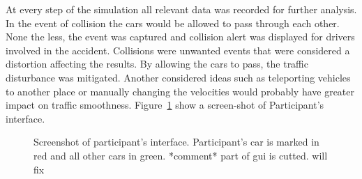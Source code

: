 \documentclass[11pt,english,twoside]{article}
\begin{document}
At every step of the simulation all relevant data was recorded for further analysis. In the event of collision the cars would be allowed to pass through each other. None the less, the event was captured and collision alert was displayed for drivers involved in the accident. Collisions were unwanted events that were considered a distortion affecting the results. By allowing the cars to pass, the traffic disturbance was mitigated. Another considered ideas such as teleporting vehicles to another place or manually changing the velocities would probably have greater impact on traffic smoothness. Figure~\ref{fig:gui_4} show a screen-shot of Participant's interface.


\begin{figure}[!] %
\caption{Screenshot of participant's interface. Participant's car is marked in red and all other cars in green. *comment* part of gui is cutted. will fix}
\label{fig:gui_4}
\end{figure}














\end{document}
